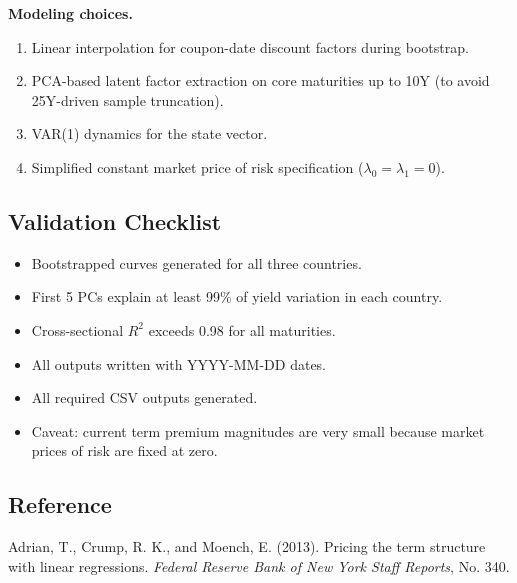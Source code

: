 \textbf{Modeling choices.}
\begin{enumerate}
  \item Linear interpolation for coupon-date discount factors during bootstrap.
  \item PCA-based latent factor extraction on core maturities up to 10Y (to avoid 25Y-driven sample truncation).
  \item VAR(1) dynamics for the state vector.
  \item Simplified constant market price of risk specification ($\lambda_0=\lambda_1=0$).
\end{enumerate}

\subsection{Validation Checklist}
\begin{itemize}
  \item Bootstrapped curves generated for all three countries.
  \item First 5 PCs explain at least 99\% of yield variation in each country.
  \item Cross-sectional $R^2$ exceeds 0.98 for all maturities.
  \item All outputs written with YYYY-MM-DD dates.
  \item All required CSV outputs generated.
  \item Caveat: current term premium magnitudes are very small because market prices of risk are fixed at zero.
\end{itemize}

\subsection{Reference}
Adrian, T., Crump, R. K., and Moench, E. (2013). Pricing the term structure with linear regressions. \emph{Federal Reserve Bank of New York Staff Reports}, No. 340.
